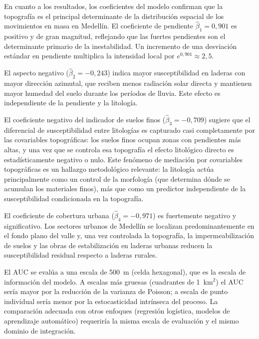 \documentclass[10pt, twocolumn, letterpaper]{article}
\begin{document}
En cuanto a los resultados, los coeficientes del modelo confirman que la
topografía es el principal determinante de la distribución espacial de los
movimientos en masa en Medellín. El coeficiente de pendiente
$\hat{\beta}_1 = 0{,}901$ es positivo y de gran magnitud, reflejando que las
fuertes pendientes son el determinante primario de la
inestabilidad. Un incremento de una desviación estándar en pendiente multiplica
la intensidad local por $e^{0{,}901} \approx 2{,}5$.

El aspecto negativo ($\hat{\beta}_2 = -0{,}243$) indica mayor susceptibilidad
en laderas con mayor dirección azimutal, que reciben menos radiación solar
directa y mantienen mayor humedad del suelo durante los períodos de lluvia.
Este efecto es independiente de la pendiente y la litología.

El coeficiente negativo del indicador de suelos finos ($\hat{\beta}_3 = -0{,}709$)
sugiere que el diferencial de susceptibilidad entre litologías es capturado casi
completamente por las covariables topográficas: los suelos finos ocupan zonas
con pendientes más altas, y una vez que
se controla esa topografía el efecto litológico directo es estadísticamente
negativo o nulo. Este fenómeno de mediación por covariables topográficas es un
hallazgo metodológico relevante: la litología actúa principalmente como un
control de la morfología (que determina dónde se acumulan los materiales
finos), más que como un predictor independiente de la susceptibilidad
condicionada en la topografía.

El coeficiente de cobertura urbana ($\hat{\beta}_4 = -0{,}971$) es fuertemente
negativo y significativo. Los sectores urbanos de Medellín se localizan
predominantemente en el fondo plano del valle y, una vez controlada la
topografía, la impermeabilización de suelos y las obras de estabilización en
laderas urbanas reducen la susceptibilidad residual respecto a laderas rurales.

El AUC se evalúa a una escala de \SI{500}{m} (celda hexagonal), que es la
escala de información del modelo. A escalas más gruesas (cuadrantes de
1~km$^2$) el AUC sería mayor por la reducción de la varianza de Poisson; a
escala de punto individual sería menor por la estocasticidad intrínseca del
proceso. La comparación adecuada con otros enfoques (regresión logística,
modelos de aprendizaje automático) requeriría la misma escala de evaluación y
el mismo dominio de integración.
\end{document}
